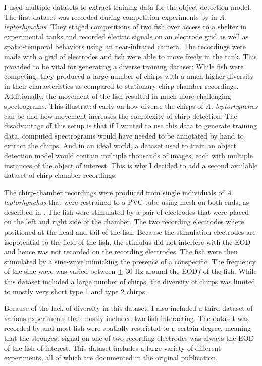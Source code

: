 I used multiple datasets to extract training data for the object detection
model. The first dataset was recorded during competition experiments by
\textcite{raabElectrocommunicationSignalsIndicate2021} in \textit{A.
leptorhynchus}. They staged competitions of two fish over access to a shelter
in experimental tanks and recorded electric signals on an electrode grid as
well as spatio-temporal behaviors using an near-infrared camera. The recordings
were made with a grid of electrodes and fish were able to move freely in the
tank. This provided to be vital for generating a diverse training dataset:
While fish were competing, they produced a large number of chirps with a much
higher diversity in their characteristics as compared to stationary
chirp-chamber recordings. Additionally, the movement of the fish resulted in
much more challenging spectrograms. This illustrated early on how diverse the
chirps of \textit{A. leptorhynchus} can be and how movement increases the
complexity of chirp detection. The disadvantage of this setup is that if I
wanted to use this data to generate training data, computed spectrograms would
have needed to be annotated by hand to extract the chirps. And in an ideal
world, a dataset used to train an object detection model would contain multiple
thousands of images, each with multiple instances of the object of interest.
This is why I decided to add a second available dataset of chirp-chamber
recordings.\label{sec:ccdata}

The chirp-chamber recordings were produced from single individuals of
\textit{A. leptorhynchus} that were restrained to a PVC tube using mesh on both
ends, as described in \textcite{stocklEncodingSocialSignals2014}. The fish
were stimulated by a pair of electrodes that were placed on the left and right
side of the chamber. The two recording electrodes where positioned at the head
and tail of the fish. Because the stimulation electrodes are isopotential to
the field of the fish, the stimulus did not interfere with the EOD and hence
was not recorded on the recording electrodes. The fish were then stimulated by
a sine-wave mimicking the presence of a conspecific. The frequency of the sine-wave was varied between $\pm$ 30 \si{\hertz} around the EOD$f$ of the fish.
While this dataset included a large number of chirps, the diversity of chirps
was limited to mostly very short type 1 and type 2 chirps
\parencite{englerSpontaneousModulationsElectric2000a}.

Because of the lack of diversity in this dataset, I also included a third
dataset of various experiments that mostly included two fish interacting. The
dataset was recorded by \textcite{obotiWhyBrownGhost2023} and most fish were
spatially restricted to a certain degree, meaning that the strongest signal on
one of two recording electrodes was always the EOD of the fish of interest.
This dataset includes a large variety of different experiments, all of which
are documented in the original publication.

